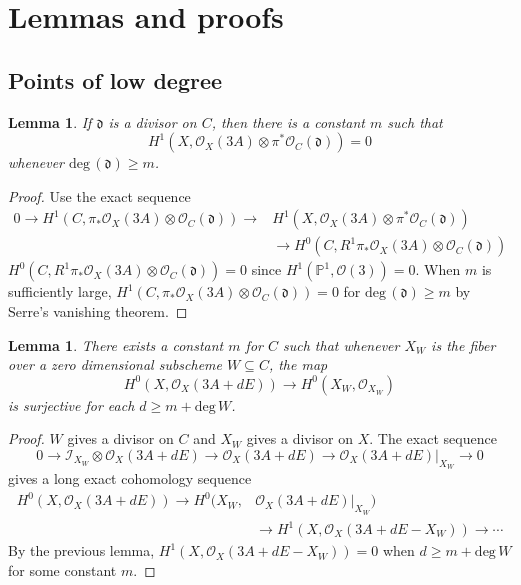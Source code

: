 \documentclass[12pt]{article}
\theoremstyle{plain}
\newtheorem{lemma}[equation]{Lemma}
\theoremstyle{definition}
\newcommand{\fd}{\mathfrak{d}}
\newcommand{\IP}{\mathbb{P}}
\newcommand{\sO}{\mathcal{O}}
\newcommand{\shI}{\mathscr{I}}
\renewcommand{\deg}{\mathrm{deg}\,}
\newcommand\tensor{{\otimes}}
\newcommand{\<}{\langle}
\renewcommand{\>}{\rangle}
\begin{document}
\section{Lemmas and proofs}

\subsection{Points of low degree}
\begin{lemma}
If $\fd$ is a divisor on $C$, then there is a constant $m$ such that 
$$ H^1(X, \sO_X(3A) \tensor \pi^* \sO_C(\fd) ) = 0 $$ whenever $\deg(\fd) \ge m$. 
\end{lemma}
\begin{proof}
Use the exact sequence 
\begin{align*}
0 \to H^1(C, \pi_* \sO_X(3A) \tensor \sO_C(\fd)) \to  & H^1(X, \sO_X(3A) \tensor \pi^* \sO_C(\fd))  \\ 
& \to H^0(C, R^1 \pi_* \sO_X(3A) \tensor \sO_C(\fd))
\end{align*}
$H^0(C, R^1 \pi_* \sO_X(3A) \tensor \sO_C(\fd)) = 0$ since $H^1(\IP^1, \sO(3)) = 0$. When $m$ is sufficiently large, $H^1(C, \pi_* \sO_X(3A) \tensor \sO_C(\fd)) = 0$ for $\deg(\fd) \ge m$ by Serre's vanishing theorem. 
\end{proof}


\begin{lemma}
\label{Serre}
There exists a constant $m$ for $C$ such that whenever $X_W$ is the fiber over a zero dimensional subscheme $W \subseteq C$, the map
$$ H^0(X, \sO_X(3A + dE)) \to H^0(X_W, \sO_{X_W}) $$
is surjective for each $d \ge m + \deg W$. 
\end{lemma}
\begin{proof}
$W$ gives a divisor on $C$ and $X_W$ gives a divisor on $X$. The exact sequence 
$$ 0 \to \shI_{X_W} \tensor \sO_X(3A + dE) \to \sO_X(3A + dE) \to \sO_X(3A + dE)|_{X_W} \to 0$$
gives a long exact cohomology sequence 
\begin{align*} H^0(X, \sO_X(3A + dE)) \to H^0(X_W, &\sO_X(3A + dE)|_{X_W}) \\ &\to H^1(X, \sO_X(3A + dE - X_W)) \to \cdots 
\end{align*}
By the previous lemma, $H^1(X, \sO_X(3A + dE - X_W)) = 0$ when $d \ge m + \deg W$ for some constant $m$.
\end{proof}
\end{document}
